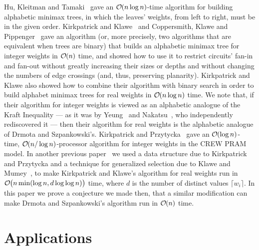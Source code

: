 \documentclass[runningheads]{llncs}
\newcommand{\Oh}[1]
    {\ensuremath{\mathcal{O} \hspace{-.5ex} \left( {#1} \right)}}
\begin{document}
Hu, Kleitman and Tamaki~\cite{HKT79} gave an $\Oh{n \log n}$-time algorithm for building alphabetic minimax trees, in which the leaves' weights, from left to right, must be in the given order.  Kirkpatrick and Klawe~\cite{KK85} and Coppersmith, Klawe and Pippenger~\cite{CKP86} gave an algorithm (or, more precisely, two algorithms that are equivalent when trees are binary) that builds an alphabetic minimax tree for integer weights in $\Oh{n}$ time, and showed how to use it to restrict circuits' fan-in and fan-out without greatly increasing their sizes or depths and without changing the numbers of edge crossings (and, thus, preserving planarity).  Kirkpatrick and Klawe also showed how to combine their algorithm with binary search in order to build alphabet minimax trees for real weights in $\Oh{n \log n}$ time.  We note that, if their algorithm for integer weights is viewed as an alphabetic analogue of the Kraft Inequality --- as it was by Yeung~\cite{Yeu91} and Nakatsu~\cite{Nak91}, who independently rediscovered it --- then their algorithm for real weights is the alphabetic analogue of Drmota and Szpankowski's.  Kirkpatrick and Przytycka~\cite{KP90} gave an $\Oh{\log n}$-time, $\Oh{n / \log n}$-processor algorithm for integer weights in the CREW PRAM model.  In another previous paper~\cite{Gag??} we used a data structure due to Kirkpatrick and Przytycka and a technique for generalized selection due to Klawe and Mumey~\cite{KM95}, to make Kirkpatrick and Klawe's algorithm for real weights run in $\Oh{\rule{0ex}{2ex} n \min (\log n, d \log \log n)}$ time, where $d$ is the number of distinct values $\lceil w_i \rceil$.  In this paper we prove a conjecture we made then, that a similar modification can make Drmota and Szpankowski's algorithm run in $\Oh{n}$ time.

\section{Applications} \label{sec:apps}
\end{document}
